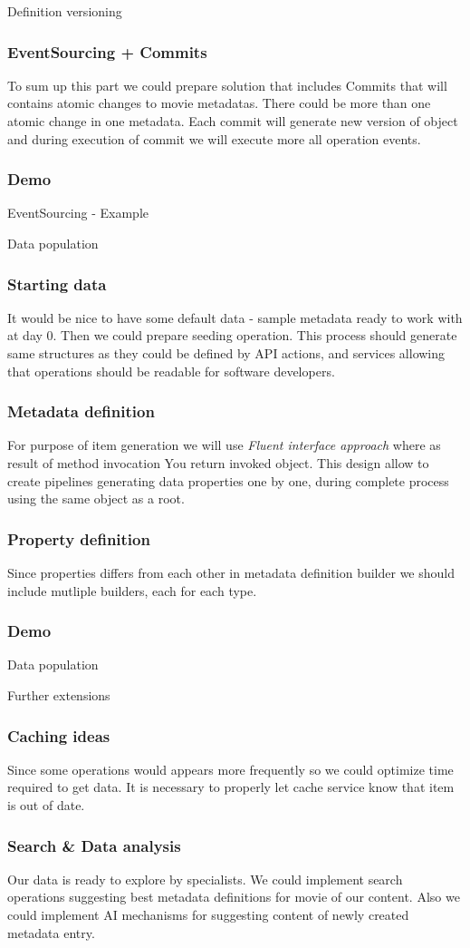 \documentclass{beamer}
\begin{document}
\begin{section}{Definition versioning}
\begin{frame}
\frametitle{EventSourcing + Commits}
To sum up this part we could prepare solution that includes Commits that will contains atomic changes to movie metadatas. There could be more than one atomic change in one metadata. 
Each commit will generate new version of object and during execution of commit we will execute more all operation events.
\end{frame}

\begin{frame}
\frametitle{Demo}
EventSourcing - Example
\end{frame}
\end{section}

\begin{section}{Data population}
\begin{frame}
\frametitle{Starting data}
It would be nice to have some default data - sample metadata ready to work with at day 0. Then we could prepare seeding operation. This process should generate same structures as they could be defined by API actions, and services allowing that operations should be readable for software developers.
\end{frame}

\begin{frame}
\frametitle{Metadata definition}
For purpose of item generation we will use \textit{Fluent interface approach} where as result of method invocation You return invoked object. This design allow to create pipelines generating data properties one by one, during complete process using the same object as a root.
\end{frame}

\begin{frame}
\frametitle{Property definition}
Since properties differs from each other in metadata definition builder we should include mutliple builders, each for each type. 
\end{frame}

\begin{frame}
\frametitle{Demo}
Data population
\end{frame}

\end{section}

\begin{section}{Further extensions}

\begin{frame}
\frametitle{Caching ideas}
Since some operations would appears more frequently so we could optimize time required to get data. It is necessary to properly let cache service know that item is out of date.
\end{frame}

\begin{frame}
\frametitle{Search \& Data analysis}
Our data is ready to explore by specialists. We could implement search operations suggesting best metadata definitions for movie of our content. Also we could implement AI mechanisms for suggesting content of newly created metadata entry.
\end{frame}

\end{section}
\end{document}

